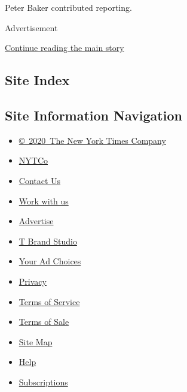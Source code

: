 Peter Baker contributed reporting.

Advertisement

\protect\hyperlink{after-bottom}{Continue reading the main story}

\hypertarget{site-index}{%
\subsection{Site Index}\label{site-index}}

\hypertarget{site-information-navigation}{%
\subsection{Site Information
Navigation}\label{site-information-navigation}}

\begin{itemize}
\tightlist
\item
  \href{https://help.nytimes.com/hc/en-us/articles/115014792127-Copyright-notice}{©~2020~The
  New York Times Company}
\end{itemize}

\begin{itemize}
\tightlist
\item
  \href{https://www.nytco.com/}{NYTCo}
\item
  \href{https://help.nytimes.com/hc/en-us/articles/115015385887-Contact-Us}{Contact
  Us}
\item
  \href{https://www.nytco.com/careers/}{Work with us}
\item
  \href{https://nytmediakit.com/}{Advertise}
\item
  \href{http://www.tbrandstudio.com/}{T Brand Studio}
\item
  \href{https://www.nytimes.com/privacy/cookie-policy\#how-do-i-manage-trackers}{Your
  Ad Choices}
\item
  \href{https://www.nytimes.com/privacy}{Privacy}
\item
  \href{https://help.nytimes.com/hc/en-us/articles/115014893428-Terms-of-service}{Terms
  of Service}
\item
  \href{https://help.nytimes.com/hc/en-us/articles/115014893968-Terms-of-sale}{Terms
  of Sale}
\item
  \href{https://spiderbites.nytimes.com}{Site Map}
\item
  \href{https://help.nytimes.com/hc/en-us}{Help}
\item
  \href{https://www.nytimes.com/subscription?campaignId=37WXW}{Subscriptions}
\end{itemize}
